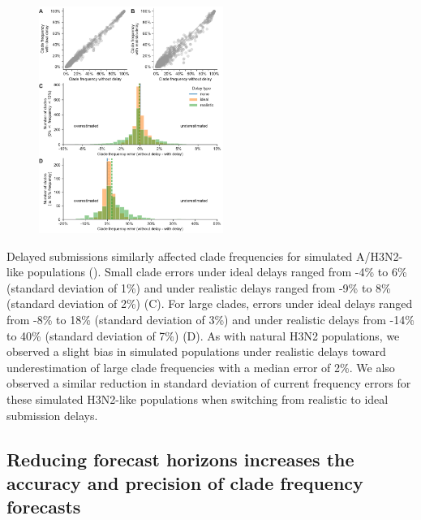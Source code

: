 \documentclass[9pt,lineno]{elife}
\begin{document}
\begin{figure}[htb!]
{\includegraphics[width=6cm]{figures/simulated_current_frequency_errors_by_delay}}\label{figsupp:simulated_current_clade_frequency_errors}
%
\label{figdata:h3n2_tip_attributes}
\label{figsrccode:current_clade_frequency_errors}
\end{figure}

Delayed submissions similarly affected clade frequencies for simulated A/H3N2-like populations ().
Small clade errors under ideal delays ranged from -4\% to 6\% (standard deviation of 1\%) and under realistic delays ranged from -9\% to 8\% (standard deviation of 2\%) (C).
For large clades, errors under ideal delays ranged from -8\% to 18\% (standard deviation of 3\%) and under realistic delays from -14\% to 40\% (standard deviation of 7\%) (D).
As with natural H3N2 populations, we observed a slight bias in simulated populations under realistic delays toward underestimation of large clade frequencies with a median error of 2\%.
We also observed a similar reduction in standard deviation of current frequency errors for these simulated H3N2-like populations when switching from realistic to ideal submission delays.

\subsection{Reducing forecast horizons increases the accuracy and precision of clade frequency forecasts}
\end{document}
